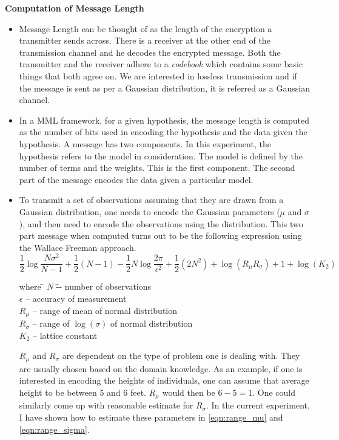 \documentclass[a4paper,12pt]{article}
\begin{document}
\noindent \textbf{Computation of Message Length}
\begin{itemize}
 \item Message Length can be thought of as the length of the encryption a transmitter sends across. There is a receiver at the other end of the transmission channel and he decodes the encrypted message. Both the transmitter and the receiver adhere to a \textit{codebook} which contains some basic things that both agree on. We are interested in lossless transmission and if the message is sent as per a Gaussian distribution, it is referred as a Gaussian channel.
 
 \item In a MML framework, for a given hypothesis, the message length is computed as the number of bits used in encoding the hypothesis and the data given the hypothesis. A message has two components. In this experiment, the hypothesis refers to the model in consideration. The model is defined by the number of terms and the weights. This is the first component. The second part of the message encodes the data given a particular model. 
 
 \item To transmit a set of observations assuming that they are drawn from a Gaussian distribution, one needs to encode the Gaussian parameters ($\mu$ and $\sigma$), and then need to encode the observations using the distribution. This two part message when computed turns out to be the following expression using the Wallace Freeman approach.
 \begin{equation} \label{eqn:wallace_freeman}
 \frac{1}{2}\log\frac{N\sigma^2}{N-1}+\frac{1}{2}(N-1)-\frac{1}{2}N\log\frac{2\pi}{\epsilon^2}+\frac{1}{2}(2N^2)+\log(R_{\mu}R_{\sigma})+1+\log(K_2) 
 \end{equation}
 \begin{tabbing}
 where  \= $N$ \= -- number of observations \\
        \> $\epsilon$ \> -- accuracy of measurement \\
        \> $R_{\mu}$ \> -- range of mean of normal distribution \\
        \> $R_{\sigma}$ \> -- range of $\log(\sigma)$ of normal distribution \\
        \> $K_2$ \> -- lattice constant 
 \end{tabbing}
$R_{\mu}$ and $R_{\sigma}$ are dependent on the type of problem one is dealing with. They are usually chosen based on the domain knowledge. As an example, if one is interested in encoding the heights of individuals, one can assume that average height to be between 5 and 6 feet. $R_{\mu}$ would then be $6-5=1$. One could similarly come up with reasonable estimate for $R_{\sigma}$. In the current experiment, I have shown how to estimate these parameters in \eqref{eqn:range_mu} and \eqref{eqn:range_sigma}.
 

\end{itemize}
\end{document}
